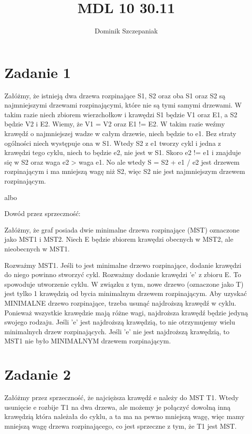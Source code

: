\documentclass[12pt]{article}
\title{MDL 10 30.11}
\author{Dominik Szczepaniak}
\begin{document}
\maketitle

\bgroup\obeylines
\section{Zadanie 1} %
Załóżmy, że istnieją dwa drzewa rozpinające S1, S2 oraz oba S1 oraz S2 są najmniejszymi drzewami rozpinającymi, które nie są tymi samymi drzewami. 
W takim razie niech zbiorem wierzchołkow i krawędzi S1 będzie V1 oraz E1, a S2 będzie V2 i E2. Wiemy, że V1 = V2 oraz E1 != E2. 
W takim razie weźmy krawędź o najmniejszej wadze w całym drzewie, niech będzie to e1. Bez straty ogólności niech występuje ona w S1. Wtedy S2 z e1 tworzy cykl i jedna z krawędzi tego cyklu, niech to będzie e2, nie jest w S1. Skoro e2 != e1 i znajduje się w S2 oraz waga e2 > waga e1.
No ale wtedy S = S2 + e1 / e2 jest drzewem rozpinającym i ma mniejszą wagę niż S2, więc S2 nie jest najmniejszym drzewem rozpinającym.

albo

Dowód przez sprzeczność:

Załóżmy, że graf posiada dwie minimalne drzewa rozpinające (MST) oznaczone jako MST1 i MST2. Niech E będzie zbiorem krawędzi obecnych w MST2, ale nieobecnych w MST1.

Rozważmy MST1. Jeśli to jest minimalne drzewo rozpinające, dodanie krawędzi do niego powinno stworzyć cykl. Rozważmy dodanie krawędzi 'e' z zbioru E. To spowoduje utworzenie cyklu. W związku z tym, nowe drzewo (oznaczone jako T) jest tylko 1 krawędzią od bycia minimalnym drzewem rozpinającym. Aby uzyskać MINIMALNE drzewo rozpinające, trzeba usunąć najdroższą krawędź w cyklu. Ponieważ wszystkie krawędzie mają różne wagi, najdroższa krawędź będzie jedyną swojego rodzaju. Jeśli 'e' jest najdroższą krawędzią, to nie otrzymujemy wielu minimalnych drzew rozpinających. Jeśli 'e' nie jest najdroższą krawędzią, to MST1 nie było MINIMALNYM drzewem rozpinającym.

\section{Zadanie 2}%
Załóżmy przez sprzeczność, że najcięższa krawędź e należy do MST T1. Wtedy usunięcie e rozbije T1 na dwa drzewa, ale możemy je połączyć dowolną inną krawędzią która należała do cyklu, a ta ma na pewno mniejszą wagę, więc mamy mniejszą wagę drzewa rozpinającego, co jest sprzeczne z tym, że T1 jest MST.
\end{document}
